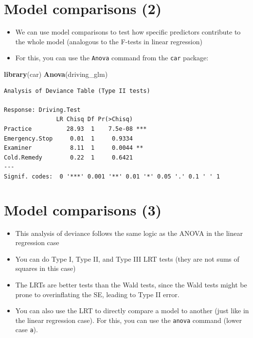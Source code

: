 \documentclass[]{article}
\newenvironment{Shaded}{}{}
\newcommand{\KeywordTok}[1]{\textcolor[rgb]{0.00,0.44,0.13}{\textbf{{#1}}}}
\newcommand{\NormalTok}[1]{{#1}}
\begin{document}
\section{Model comparisons (2)}\label{model-comparisons-2}

\begin{itemize}
\itemsep1pt\parskip0pt
\item
  We can use model comparisons to test how specific predictors
  contribute to the whole model (analogous to the F-tests in linear
  regression)
\item
  For this, you can use the \texttt{Anova} command from the \texttt{car}
  package:
\end{itemize}

\begin{Shaded}
\begin{Highlighting}[]
\KeywordTok{library}\NormalTok{(car)}
\KeywordTok{Anova}\NormalTok{(driving_glm)}
\end{Highlighting}
\end{Shaded}

\begin{verbatim}
Analysis of Deviance Table (Type II tests)

Response: Driving.Test
               LR Chisq Df Pr(>Chisq)    
Practice          28.93  1    7.5e-08 ***
Emergency.Stop     0.01  1     0.9334    
Examiner           8.11  1     0.0044 ** 
Cold.Remedy        0.22  1     0.6421    
---
Signif. codes:  0 '***' 0.001 '**' 0.01 '*' 0.05 '.' 0.1 ' ' 1
\end{verbatim}

\section{Model comparisons (3)}\label{model-comparisons-3}

\begin{itemize}
\itemsep1pt\parskip0pt
\item
  This analysis of deviance follows the same logic as the ANOVA in the
  linear regression case
\item
  You can do Type I, Type II, and Type III LRT tests (they are not sums
  of squares in this case)
\item
  The LRTs are better tests than the Wald tests, since the Wald tests
  might be prone to overinflating the SE, leading to Type II error.
\item
  You can also use the LRT to directly compare a model to another (just
  like in the linear regression case). For this, you can use the
  \texttt{anova} command (lower case \texttt{a}).
\end{itemize}
\end{document}
